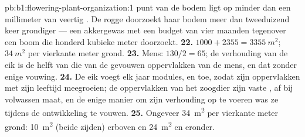 \begin{solution}{pb:b1:flowering-plant-organization:1}
punt van de bodem ligt op minder dan een millimeter van veertig . De
rogge doorzoekt haar bodem meer dan tweeduizend keer grondiger --- een
akkergewas met een budget van vier maanden tegenover een boom die honderd
kubieke meter doorzoekt.
\textbf{22.} $1000 + 2355 = \qty{3355}{m^2}$; $\qty{34}{m^2}$ per
vierkante meter grond.
\textbf{23.} Mens: $130/2 = 65$; de verhouding van de eik is de helft van die
van de gevouwen oppervlakken van de mens, en dat zonder enige vouwing.
\textbf{24.} De eik voegt elk jaar modules,  en  toe, zodat zijn
oppervlakken met zijn leeftijd meegroeien; de oppervlakken van het zoogdier zijn
vaste , af bij volwassen maat, en de enige manier om zijn verhouding op te
voeren was ze tijdens de ontwikkeling te vouwen.
\textbf{25.} Ongeveer \qty{34}{m^2}  per vierkante meter
grond: \qty{10}{m^2}  (beide zijden) erboven en \qty{24}{m^2}
 en  eronder.
\end{solution}
